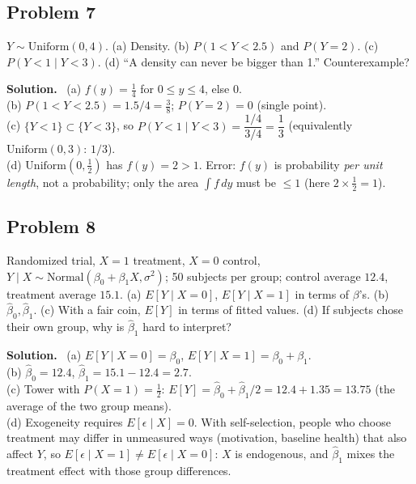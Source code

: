 \documentclass[11pt]{article}
\newcommand{\Unif}{\text{Uniform}}
\newcommand{\Norm}{\text{Normal}}
\newenvironment{soln}{\par\smallskip\noindent\textbf{Solution.}\ }{\par\medskip}
\begin{document}
\subsection*{Problem 7}
$Y\sim\Unif(0,4)$. (a) Density. (b) $P(1<Y<2.5)$ and $P(Y=2)$. (c) $P(Y<1\mid Y<3)$. (d) ``A density can never be bigger than 1.'' Counterexample?
\begin{soln}
(a) $f(y)=\frac14$ for $0\le y\le4$, else $0$.\\
(b) $P(1<Y<2.5)=1.5/4=\frac38$; $P(Y{=}2)=0$ (single point).\\
(c) $\{Y<1\}\subset\{Y<3\}$, so $P(Y<1\mid Y<3)=\dfrac{1/4}{3/4}=\dfrac13$ (equivalently $\Unif(0,3)$: $1/3$).\\
(d) $\Unif(0,\frac12)$ has $f(y)=2>1$. Error: $f(y)$ is probability \emph{per unit length}, not a probability; only the area $\int f\,dy$ must be $\le1$ (here $2\times\frac12=1$).
\end{soln}

\subsection*{Problem 8}
Randomized trial, $X=1$ treatment, $X=0$ control, $Y\mid X\sim\Norm(\beta_0+\beta_1X,\sigma^2)$; 50 subjects per group; control average $12.4$, treatment average $15.1$.
(a) $E[Y\mid X{=}0]$, $E[Y\mid X{=}1]$ in terms of $\beta$'s. (b) $\hat\beta_0,\hat\beta_1$. (c) With a fair coin, $E[Y]$ in terms of fitted values. (d) If subjects chose their own group, why is $\hat\beta_1$ hard to interpret?
\begin{soln}
(a) $E[Y\mid X{=}0]=\beta_0$, $E[Y\mid X{=}1]=\beta_0+\beta_1$.\\
(b) $\hat\beta_0=12.4$, $\hat\beta_1=15.1-12.4=2.7$.\\
(c) Tower with $P(X{=}1)=\frac12$: $E[Y]=\hat\beta_0+\hat\beta_1/2=12.4+1.35=13.75$ (the average of the two group means).\\
(d) Exogeneity requires $E[\epsilon\mid X]=0$. With self-selection, people who choose treatment may differ in unmeasured ways (motivation, baseline health) that also affect $Y$, so $E[\epsilon\mid X{=}1]\ne E[\epsilon\mid X{=}0]$: $X$ is endogenous, and $\hat\beta_1$ mixes the treatment effect with those group differences.
\end{soln}

\end{document}

